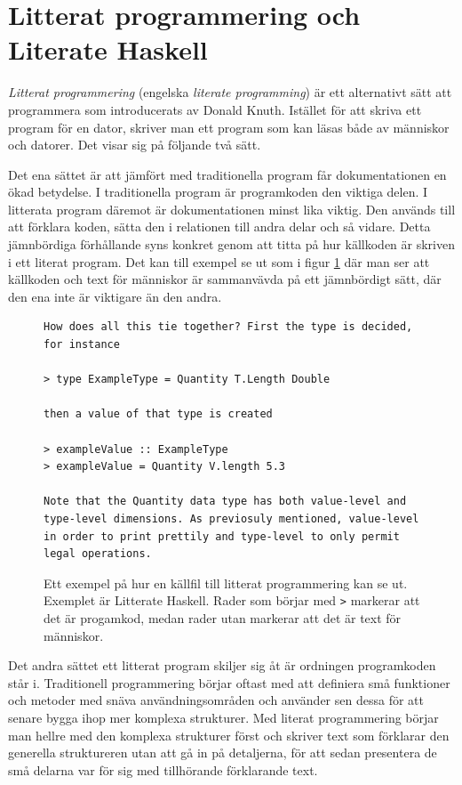 \section{Litterat programmering och Literate Haskell}
\label{sec:lhs}
\begin{draft}
\textit{Litterat programmering} (engelska \textit{literate programming}) är ett
alternativt sätt att programmera som introducerats av Donald Knuth.\cite{knuth}
Istället för att skriva ett program för en dator, skriver man ett program som
kan läsas både av människor och datorer. Det visar sig på följande två sätt.

Det ena sättet är att jämfört med traditionella program får dokumentationen en
ökad betydelse. I traditionella program är programkoden den viktiga delen. I
litterata program däremot är dokumentationen minst lika viktig. Den används till
att förklara koden, sätta den i relationen till andra delar och så vidare.
Detta jämnbördiga förhållande syns konkret genom att titta på hur källkoden är
skriven i ett literat program. Det kan till exempel se ut som i figur
\ref{fig:litterate_haskell_exempel} där man ser att källkoden och text för
människor är sammanvävda på ett jämnbördigt sätt, där den ena inte är viktigare
än den andra.

\begin{figure}[tph]
  \begin{lstlisting}[language={}]
How does all this tie together? First the type is decided, for instance

> type ExampleType = Quantity T.Length Double

then a value of that type is created

> exampleValue :: ExampleType
> exampleValue = Quantity V.length 5.3

Note that the Quantity data type has both value-level and type-level dimensions. As previosuly mentioned, value-level in order to print prettily and type-level to only permit legal operations.
  \end{lstlisting}
  \caption{Ett exempel på hur en källfil till litterat programmering kan se ut. Exemplet är Litterate Haskell. Rader som börjar med \texttt{>} markerar att det är progamkod, medan rader utan markerar att det är text för människor.}
  \label{fig:litterate_haskell_exempel}
\end{figure}

Det andra sättet ett litterat program skiljer sig åt är ordningen programkoden
står i. Traditionell programmering börjar oftast med att definiera små funktioner
och metoder med snäva användningsområden och använder sen dessa för att senare
bygga ihop mer komplexa strukturer. Med literat programmering börjar man hellre
med den komplexa strukturer först och skriver text som förklarar den generella
struktureren utan att gå in på detaljerna, för att sedan presentera de små
delarna var för sig med tillhörande förklarande text.


\end{draft}
